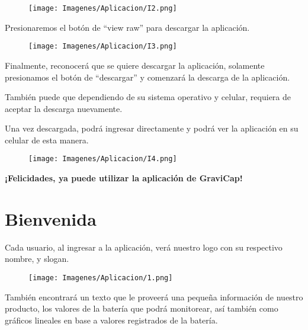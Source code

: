         \begin{figure} [H]
            \centering
            \texttt{[image: Imagenes/Aplicacion/I2.png]}
        \end{figure}

        Presionaremos el botón de “view raw” para descargar la aplicación.\par

        \begin{figure} [H]
            \centering
            \texttt{[image: Imagenes/Aplicacion/I3.png]}
        \end{figure}

        Finalmente, reconocerá que se quiere descargar la aplicación, solamente presionamos el botón de “descargar” y comenzará la descarga de la aplicación.\par
        También puede que dependiendo de su sistema operativo y celular, requiera de aceptar la descarga nuevamente.\par
        Una vez descargada, podrá ingresar directamente y podrá ver la aplicación en su celular de esta manera.\par

        \begin{figure} [H]
            \centering
            \texttt{[image: Imagenes/Aplicacion/I4.png]}
        \end{figure}
        \begin{center}
            \Large{\textbf{¡Felicidades, ya puede utilizar la aplicación de \textcolor{dark_violet}{GraviCap}!}}\par
        \end{center}
        
        \newpage
    \section{Bienvenida}
        Cada usuario, al ingresar a la aplicación, verá nuestro logo con su respectivo nombre, y slogan.\par

        \begin{figure} [H]
            \centering
            \texttt{[image: Imagenes/Aplicacion/1.png]}
        \end{figure}

        También encontrará un texto que le proveerá una pequeña información de nuestro producto, los valores de la batería que podrá monitorear, así también como gráficos lineales en base a valores registrados de la batería.\par

